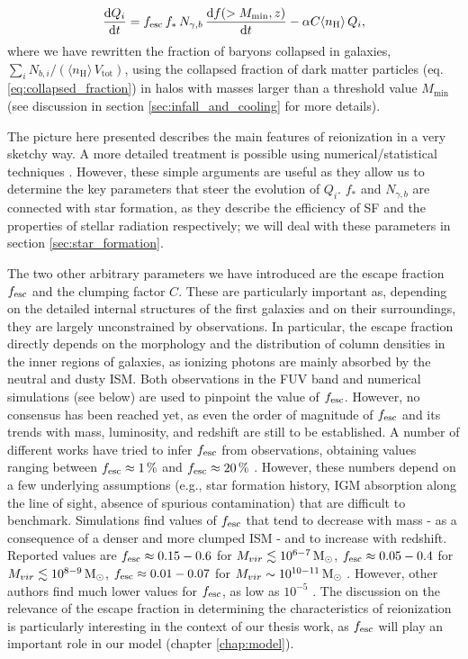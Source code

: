    \begin{align}
   \frac{\mathrm{d} Q_i}{\mathrm{d} t} = f_{\rm esc} \, f_*\, N_{\gamma,b}\,\frac{\mathrm{d} f(>M_\mathrm{min},z)}{\mathrm{d} t} - \alpha C \langle n_\mathrm{H}\rangle\,Q_i, \label{eq:reionization_equation}
  \end{align}
  where we have rewritten the fraction of baryons collapsed in galaxies, $\sum_i N_{b,i}/(\langle n_\mathrm{H}\rangle\,V_\mathrm{tot})$, using the collapsed fraction of dark matter particles (eq. \ref{eq:collapsed_fraction}) in halos with masses larger than a threshold value $M_\mathrm{min}$ (see discussion in section \ref{sec:infall_and_cooling} for more details). 
  
  The picture here presented describes the main features of reionization in a very sketchy way. A more detailed treatment is possible using numerical/statistical techniques \citep[e.g.,][]{mesinger_2016}. However, these simple arguments are useful as they allow us to determine the key parameters that steer the evolution of $Q_i$. $f_*$ and $N_{\gamma, b}$ are connected with star formation, as they describe the efficiency of SF and the properties of stellar radiation respectively; we will deal with these parameters in section \ref{sec:star_formation}. 
  
  The two other arbitrary parameters we have introduced are the escape fraction $f_{\rm esc}$ and the clumping factor $C$. These are particularly important as, depending on the detailed internal structures of the first galaxies and on their surroundings, they are largely unconstrained by observations. In particular, the escape fraction directly depends on the morphology and the distribution of column densities in the inner regions of galaxies, as ionizing photons are mainly absorbed by the neutral and dusty ISM. Both observations in the FUV band and numerical simulations (see below) are used to pinpoint the value of $f_{\rm esc}$. 
  However, no consensus has been reached yet, as even the order of magnitude of $f_{\rm esc}$ and its trends with mass, luminosity, and redshift are still to be established. A number of different works have tried to infer $f_{\rm esc}$ from observations, obtaining values ranging between $f_{\rm esc} \approx 1\,\%$ and $f_{\rm esc} \approx 20\,\%$ \citep[e.g.,][]{inoue2006escape}. However, these numbers depend on a few underlying assumptions (e.g., star formation history, IGM absorption along the line of sight, absence of spurious contamination) that are difficult to benchmark. Simulations find values of $f_{\rm esc}$ that tend to decrease with mass - as a consequence of a denser and more clumped ISM - and to increase with redshift. Reported values are $f_{\rm esc} \approx 0.15- 0.6$ for $M_{vir}\lesssim 10^{6-7}\,{\rm M}_{\odot}$, $f_{\rm esc} \approx 0.05 -0.4$ for $M_{vir}\lesssim 10^{8-9}\,{\rm M}_{\odot}$, $f_{\rm esc}\approx 0.01- 0.07$ for $M_{vir}\sim 10^{10-11}\,{\rm M}_{\odot}$ \citep{xu2016galaxy,wise2014birth, ma2020no}. However, other authors find much lower values for $f_{\rm esc}$, as low as $10^{-5}$ \citep{paardekooper2015first}.
  The discussion on the relevance of the escape fraction in determining the characteristics of reionization is particularly interesting in the context of our thesis work, as $f_{\rm esc}$ will play an important role in our model (chapter \ref{chap:model}).
 
